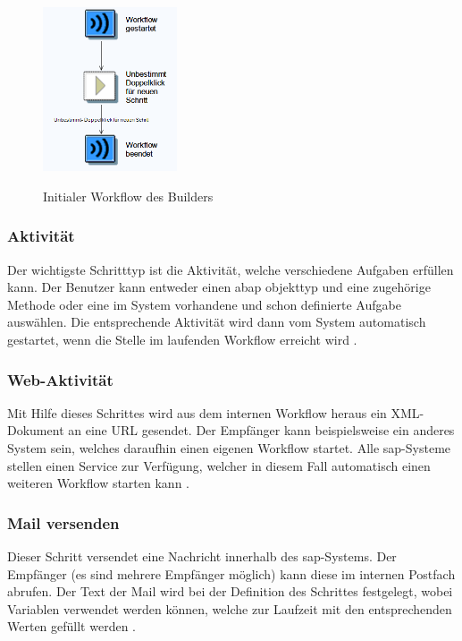 \begin{figure}[h]
	\begin{center}
	\includegraphics[width=150px]{grafiken/wf-builder_new-wf.png}
	\caption{Initialer Workflow des Builders}
	\vspace{-10pt}
	\label{abb:workflow-easy}
	\end{center}
\end{figure}

\subsubsection{Aktivität}
Der wichtigste Schritttyp ist die Aktivität, welche verschiedene Aufgaben erfüllen kann. Der Benutzer kann entweder einen \gls{abap} \gls{objekttyp} und eine zugehörige Methode oder eine im System vorhandene und schon definierte Aufgabe auswählen. Die entsprechende Aktivität wird dann vom System automatisch gestartet, wenn die Stelle im laufenden Workflow erreicht wird \cite{SAPHelpWf}.

\subsubsection{Web-Aktivität}
Mit Hilfe dieses Schrittes wird aus dem internen Workflow heraus ein XML-Dokument an eine URL gesendet. Der Empfänger kann beispielsweise ein anderes System sein, welches daraufhin einen eigenen Workflow startet. Alle \gls{sap}-Systeme stellen einen Service zur Verfügung, welcher in diesem Fall automatisch einen weiteren Workflow starten kann \cite{SAPHelpWf}.

\subsubsection{Mail versenden}
Dieser Schritt versendet eine Nachricht innerhalb des \gls{sap}-Systems. Der Empfänger (es sind mehrere Empfänger möglich) kann diese im internen Postfach abrufen. Der Text der Mail wird bei der Definition des Schrittes festgelegt, wobei Variablen verwendet werden können, welche zur Laufzeit mit den entsprechenden Werten gefüllt werden \cite{SAPHelpWf}.

